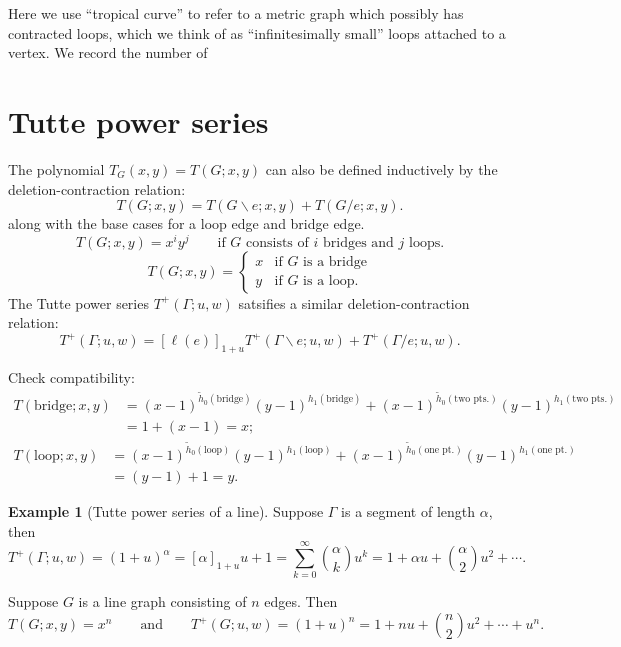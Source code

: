 \documentclass{amsart}
\theoremstyle{definition}
\newtheorem{eg}[thm]{Example}
\begin{document}
Here we use ``tropical curve'' 
to refer to a metric graph which possibly has contracted loops,
which we think of as ``infinitesimally small'' loops attached to a vertex.
We record the number of 


\section{Tutte power series}
The polynomial $T_G(x,y) = T(G; x,y)$ can also be defined inductively by the 
deletion-contraction relation:
\begin{equation*}
T(G;x,y) = T(G \backslash e; x,y) + T(G / e; x,y).
\end{equation*}
along with the base cases for a loop edge and bridge edge.
\begin{equation*}
T(G; x,y) = x^i y^j \qquad\text{if $G$ consists of $i$ bridges and $j$ loops.}
\end{equation*}
\begin{equation*}
T(G;x,y) = \begin{cases}
x & \text{if $G$ is a bridge} \\
y & \text{if $G$ is a loop}.
\end{cases}
\end{equation*}
The Tutte power series $T^+(\Gamma; u,w)$ satsifies a similar deletion-contraction relation:
\begin{equation}
T^+(\Gamma; u,w) = [\ell(e)]_{1+u} T^+(\Gamma \backslash e; u,w) + T^+(\Gamma / e; u,w) .
\end{equation}

Check compatibility:
\begin{align*}
T(\text{bridge}; x,y) 
&= (x-1)^{\tilde h_0(\text{bridge}) }(y-1)^{h_1(\text{bridge} )} 
+ (x-1)^{\tilde h_0(\text{two pts.}) }(y-1)^{h_1(\text{two pts.})}  \\
&= 1 + (x-1) = x ;
\end{align*}
\begin{align*}
T(\text{loop}; x,y) 
&= (x-1)^{\tilde h_0(\text{loop}) }(y-1)^{h_1(\text{loop} )} 
+ (x-1)^{\tilde h_0(\text{one pt.}) }(y-1)^{h_1(\text{one pt.})} \\
&= (y-1) + 1 = y .
\end{align*}

\begin{eg}[Tutte power series of a line]
Suppose $\Gamma$ is a segment of length $\alpha$,
then
$$
T^+(\Gamma;u,w) = (1+u)^\alpha
= [\alpha]_{1+u} u + 1 = \sum_{k=0}^\infty \binom{\alpha}{k} u^k
= 1 + \alpha u + \binom{\alpha}{2}u^2 + \cdots .
$$

Suppose $G$ is a line graph consisting of $n$ edges.
Then
$$
T(G;x,y) = x^n 
\qquad\text{and}\qquad 
T^+(G;u,w) = (1+u)^n = 1 + nu + \binom{n}{2}u^2 + \cdots + u^n.
$$
\end{eg}
\end{document}
